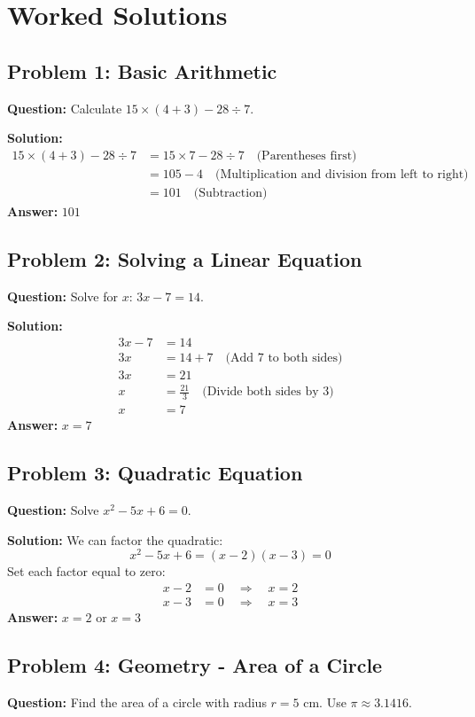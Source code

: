 \documentclass{article}
\begin{document}
\section*{Worked Solutions}

\subsection*{Problem 1: Basic Arithmetic}
\textbf{Question:} Calculate \( 15 \times (4 + 3) - 28 \div 7 \).

\textbf{Solution:}
\begin{align*}
15 \times (4 + 3) - 28 \div 7 &= 15 \times 7 - 28 \div 7 \quad \text{(Parentheses first)} \\
&= 105 - 4 \quad \text{(Multiplication and division from left to right)} \\
&= 101 \quad \text{(Subtraction)}
\end{align*}
\textbf{Answer:} \( \boxed{101} \)

\subsection*{Problem 2: Solving a Linear Equation}
\textbf{Question:} Solve for \( x \): \( 3x - 7 = 14 \).

\textbf{Solution:}
\begin{align*}
3x - 7 &= 14 \\
3x &= 14 + 7 \quad \text{(Add 7 to both sides)} \\
3x &= 21 \\
x &= \frac{21}{3} \quad \text{(Divide both sides by 3)} \\
x &= 7
\end{align*}
\textbf{Answer:} \( \boxed{x = 7} \)

\subsection*{Problem 3: Quadratic Equation}
\textbf{Question:} Solve \( x^2 - 5x + 6 = 0 \).

\textbf{Solution:}
We can factor the quadratic:
\[
x^2 - 5x + 6 = (x - 2)(x - 3) = 0
\]
Set each factor equal to zero:
\begin{align*}
x - 2 &= 0 \quad \Rightarrow \quad x = 2 \\
x - 3 &= 0 \quad \Rightarrow \quad x = 3
\end{align*}
\textbf{Answer:} \( \boxed{x = 2 \text{ or } x = 3} \)

\subsection*{Problem 4: Geometry - Area of a Circle}
\textbf{Question:} Find the area of a circle with radius \( r = 5 \) cm. Use \( \pi \approx 3.1416 \).
\end{document}
